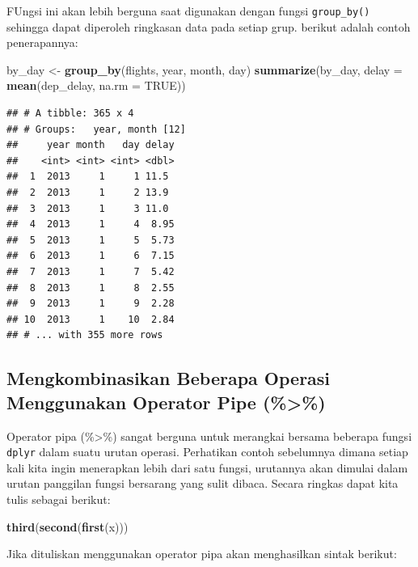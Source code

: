 \documentclass[]{book}
\newenvironment{Shaded}{\begin{snugshade}}{\end{snugshade}}
\newcommand{\KeywordTok}[1]{\textcolor[rgb]{0.13,0.29,0.53}{\textbf{#1}}}
\newcommand{\DataTypeTok}[1]{\textcolor[rgb]{0.13,0.29,0.53}{#1}}
\newcommand{\StringTok}[1]{\textcolor[rgb]{0.31,0.60,0.02}{#1}}
\newcommand{\OtherTok}[1]{\textcolor[rgb]{0.56,0.35,0.01}{#1}}
\newcommand{\OperatorTok}[1]{\textcolor[rgb]{0.81,0.36,0.00}{\textbf{#1}}}
\newcommand{\NormalTok}[1]{#1}
\begin{document}
FUngsi ini akan lebih berguna saat digunakan dengan fungsi
\texttt{group\_by()} sehingga dapat diperoleh ringkasan data pada setiap
grup. berikut adalah contoh penerapannya:

\begin{Shaded}
\begin{Highlighting}[]
\NormalTok{by_day <-}\StringTok{ }\KeywordTok{group_by}\NormalTok{(flights, year, month, day)}
    \KeywordTok{summarize}\NormalTok{(by_day, }\DataTypeTok{delay =} \KeywordTok{mean}\NormalTok{(dep_delay, }\DataTypeTok{na.rm =} \OtherTok{TRUE}\NormalTok{))}
\end{Highlighting}
\end{Shaded}

\begin{verbatim}
## # A tibble: 365 x 4
## # Groups:   year, month [12]
##     year month   day delay
##    <int> <int> <int> <dbl>
##  1  2013     1     1 11.5 
##  2  2013     1     2 13.9 
##  3  2013     1     3 11.0 
##  4  2013     1     4  8.95
##  5  2013     1     5  5.73
##  6  2013     1     6  7.15
##  7  2013     1     7  5.42
##  8  2013     1     8  2.55
##  9  2013     1     9  2.28
## 10  2013     1    10  2.84
## # ... with 355 more rows
\end{verbatim}

\subsection{Mengkombinasikan Beberapa Operasi Menggunakan Operator Pipe
(\%\textgreater{}\%)}\label{mengkombinasikan-beberapa-operasi-menggunakan-operator-pipe}

Operator pipa (\%\textgreater{}\%) sangat berguna untuk merangkai
bersama beberapa fungsi \texttt{dplyr} dalam suatu urutan operasi.
Perhatikan contoh sebelumnya dimana setiap kali kita ingin menerapkan
lebih dari satu fungsi, urutannya akan dimulai dalam urutan panggilan
fungsi bersarang yang sulit dibaca. Secara ringkas dapat kita tulis
sebagai berikut:

\begin{Shaded}
\begin{Highlighting}[]
\KeywordTok{third}\NormalTok{(}\KeywordTok{second}\NormalTok{(}\KeywordTok{first}\NormalTok{(x)))}
\end{Highlighting}
\end{Shaded}

Jika dituliskan menggunakan operator pipa akan menghasilkan sintak
berikut:

\begin{Shaded}
\end{Shaded}
\end{document}
